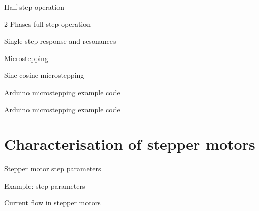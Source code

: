 \documentclass[compress]{beamer}
\begin{document}
{
    \begin{frame}{Half step operation}
    \end{frame}
}

{
    \begin{frame}{2 Phases full step operation}
    \end{frame}
}

{
    \begin{frame}{Single step response and resonances}
    \end{frame}
}

{
    \begin{frame}{Microstepping}
    \end{frame}
}

{
    \begin{frame}{Sine-cosine microstepping}
    \end{frame}
}

{
    \begin{frame}{Arduino microstepping example code}
    \end{frame}
}

{
    \begin{frame}{Arduino microstepping example code}
    \end{frame}
}

\section[Characterisation]{Characterisation of stepper motors}

{
    \begin{frame}{Stepper motor step parameters}
    \end{frame}
}

{
    \begin{frame}{Example: step parameters}
    \end{frame}
}
{
    \begin{frame}{Current flow in stepper motors}
    \end{frame}
}
\end{document}
